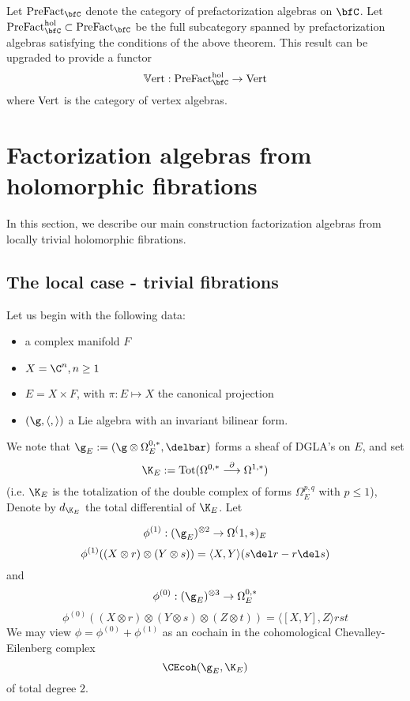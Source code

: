 \documentclass[12pt]{amsart}
\theoremstyle{definition}
\theoremstyle{remark}
\newcommand{\on}{\operatorname}
\begin{document}
Let ${\rm PreFact}_\bfC$ denote the category of prefactorization
algebras on $\bfC$. Let ${\rm PreFact}^{\rm hol}_\bfC \subset {\rm
  PreFact}_\bfC$ be the full subcategory spanned by prefactorization
algebras satisfying the conditions of the above theorem. This result
can be upgraded to provide a functor
\[
\mathbb{V}{\rm ert} : {\rm PreFact}^{\rm hol}_\bfC \to {\rm Vert}
\]
where ${\rm Vert}$ is the category of vertex algebras. 

\section{Factorization algebras from holomorphic fibrations}

In this section, we describe our main construction factorization algebras from locally trivial holomorphic fibrations. 

\subsection{The local case - trivial fibrations}

Let us begin with the following data:
\begin{itemize}
\item a complex manifold $F$
\item $X = \C^n, n \geq 1$
\item $E = X \times F$, with $\pi: E \mapsto X $ the canonical projection
\item $(\g, \langle, \rangle)$ a Lie algebra with an invariant bilinear form.
\end{itemize}

We note that $\g_E := (\g \otimes \Omega^{0,*}_E, \delbar)$ forms a sheaf of DGLA's on $E$, and
set
\[
\K_E := \on{Tot} ( \Omega^{0,*} \overset{\partial}{\longrightarrow} \Omega^{1,*})
\]
(i.e. $\K_E$ is the totalization of the double complex of forms $\Omega^{p,q}_E$ with $p \leq 1$), Denote by $d_{\K_E}$ the total differential of $\K_E$. 
Let 

$$ \phi^{(1)}: (\g_{E})^{\otimes 2} \rightarrow \Omega^(1,*)_{E} $$
$$ \phi^{(1)} ((X \otimes r) \otimes (Y \otimes s)) = \langle X, Y \rangle (s \del r - r \del s) $$
and 
$$ \phi^{(0)}: (\g_{E})^{\otimes 3} \rightarrow \Omega^{0,*}_E $$
$$ \phi^{(0)}( (X \otimes r)\otimes(Y \otimes s) \otimes (Z \otimes t)) = \langle [X,Y], Z \rangle rst $$
We may view $\phi = \phi^{(0)} + \phi^{(1)}$ as an cochain in the cohomological Chevalley-Eilenberg complex $$ \CEcoh(\g_{E}, \K_{E}) $$ of total degree $2$.
\end{document}
